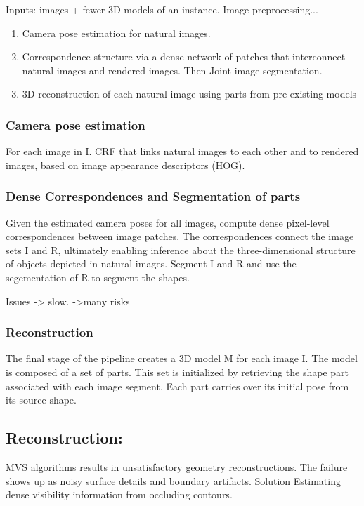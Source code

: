 \documentclass{article}
\begin{document}
Inputs: images + fewer 3D models of an instance.
Image preprocessing...

\begin{enumerate}
	\item Camera pose estimation for natural images.
	\item Correspondence structure via a dense network of patches that interconnect natural images and rendered images. Then Joint image segmentation. 
	\item 3D reconstruction of each natural image using parts from pre-existing models
\end{enumerate}

\subsubsection*{ Camera pose estimation }
For each image in I. CRF that links natural images to each other and to rendered images, based on image appearance descriptors (HOG). 

\subsubsection*{ Dense Correspondences and Segmentation of parts }
Given the estimated camera poses for all images, compute dense pixel-level correspondences between image patches. The correspondences connect the image sets I and R, ultimately enabling inference about the three-dimensional structure of objects depicted in natural images. Segment I and R and use the segementation of R to segment the shapes.

Issues
-> slow.
->many risks

\subsubsection*{ Reconstruction }

The final stage of the pipeline creates a 3D model M for each image I. The model is composed of a set of parts. This set is initialized by retrieving the shape part associated with each image segment. Each part carries over its initial pose from its source shape.

\subsection{ Reconstruction: \cite{shan2014occluding} }

MVS algorithms results in unsatisfactory geometry reconstructions. The failure shows up as noisy surface details and boundary artifacts. 
Solution
Estimating dense visibility information from occluding contours.
\end{document}

